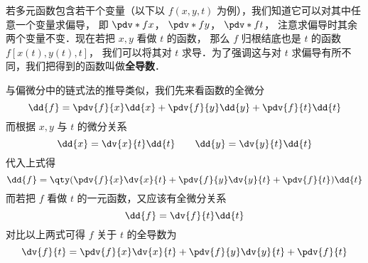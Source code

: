 
\begin{issues}
\end{issues}


若多元函数包含若干个变量（以下以 $f(x,y,t)$ 为例），我们知道它可以对其中任意一个变量求偏导， 即 $\pdv*{f}{x}$，  $\pdv*{f}{y}$，  $\pdv*{f}{t}$， 注意求偏导时其余两个变量不变．现在若把 $x,y$ 看做 $t$ 的函数， 那么 $f$ 归根结底也是 $t$ 的函数 $f[x(t),y(t),t]$， 我们可以将其对 $t$ 求导．为了强调这与对 $t$ 求偏导有所不同，我们把得到的函数叫做\textbf{全导数}．

与偏微分中的链式法的推导类似，我们先来看函数的全微分
\begin{equation}
\dd{f} = \pdv{f}{x} \dd{x} + \pdv{f}{y} \dd{y} + \pdv{f}{t} \dd{t}
\end{equation}
而根据 $x,y$ 与 $t$ 的微分关系
\begin{equation}
\dd{x} = \dv{x}{t} \dd{t} \qquad  \dd{y} = \dv{y}{t} \dd{t}
\end{equation}
代入上式得
\begin{equation}
\dd{f} = \qty( \pdv{f}{x}\dv{x}{t} + \pdv{f}{y}\dv{y}{t} + \pdv{f}{t} )\dd{t}
\end{equation}
而若把 $f$ 看做 $t$ 的一元函数，又应该有全微分关系
\begin{equation}
\dd{f} = \dv{f}{t} \dd{t}
\end{equation}
对比以上两式可得 $f$ 关于 $t$ 的全导数为
\begin{equation}
\dv{f}{t} = \pdv{f}{x}\dv{x}{t} + \pdv{f}{y}\dv{y}{t} + \pdv{f}{t}
\end{equation}

